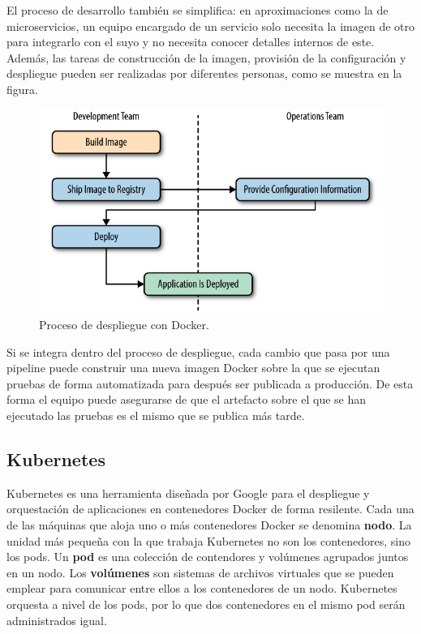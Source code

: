 \documentclass[11pt,spanish,listoffigures,listoftables]{tfgetsinf}
\begin{document}
El proceso de desarrollo también se simplifica: en aproximaciones como la de microservicios, un equipo encargado de un servicio solo necesita la imagen de otro para integrarlo con el suyo y no necesita conocer detalles internos de este. Además, las tareas de construcción de la imagen, provisión de la configuración y despliegue pueden ser realizadas por diferentes personas, como se muestra en la figura. 

\begin{figure}[h]
\centering
\includegraphics[scale=0.7]{docker_process}
\caption{Proceso de despliegue con Docker. \cite{Matthias}}
\end{figure}


Si se integra dentro del proceso de despliegue, cada cambio que pasa por una pipeline puede construir una nueva imagen Docker sobre la que se ejecutan pruebas de forma automatizada para después ser publicada a producción. De esta forma el equipo puede asegurarse de que el artefacto sobre el que se han ejecutado las pruebas es el mismo que se publica más tarde. 

\subsection{Kubernetes}

Kubernetes es una herramienta diseñada por Google para el despliegue y orquestación de aplicaciones en contenedores Docker de forma resilente. Cada una de las máquinas que aloja uno o más contenedores Docker se denomina \textbf{nodo}. La unidad más pequeña con la que trabaja Kubernetes no son los contenedores, sino los pods. Un \textbf{pod} es una colección de contendores y volúmenes agrupados juntos en un nodo. Los \textbf{volúmenes} son sistemas de archivos virtuales que se pueden emplear para comunicar entre ellos a los contenedores de un nodo. Kubernetes orquesta a nivel de los pods, por lo que dos contenedores en el mismo pod serán administrados igual. \cite{Rensin2015}
\end{document}
